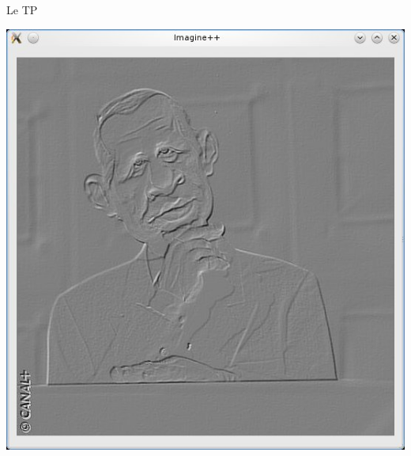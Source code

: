 \begin{frame}{Le TP}
\begin{minipage}{0.47\linewidth}
    \includegraphics[width=0.47\linewidth]{images/ppd_4.png}
\end{minipage}

\end{frame}




